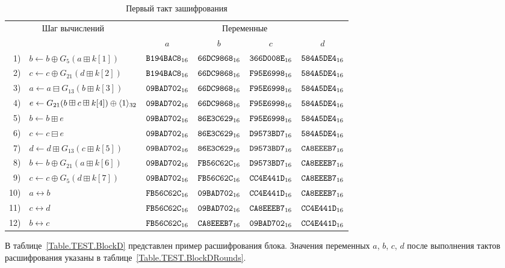 \begin{table}[H]
\caption{Первый такт зашифрования}\label{Table.TEST.BlockEFirstRound}
\begin{tabular}{|rl|c|c|c|c|}
\hline
\multicolumn{2}{|c}{Шаг вычислений}  & \multicolumn{4}{|c|}{Переменные}\\
\cline{3-6}
& & $a$&$b$&$c$&$d$\\
\hline
\hline
1) & $b\leftarrow b\oplus G_5(a\boxplus k[1])$ & 
$\texttt{B194BAC8}_{16}$ &
$\texttt{66DC9868}_{16}$ &
$\texttt{366D008E}_{16}$ &
$\texttt{584A5DE4}_{16}$\\
%
\hline
2) & $c\leftarrow c\oplus G_{21}(d\boxplus k[2])$ & 
$\texttt{B194BAC8}_{16}$ &
$\texttt{66DC9868}_{16}$ &
$\texttt{F95E6998}_{16}$ &
$\texttt{584A5DE4}_{16}$\\
%
\hline
3) & $a\leftarrow a\boxminus G_{13}(b\boxplus k[3])$ & 
$\texttt{09BAD702}_{16}$ &
$\texttt{66DC9868}_{16}$ &
$\texttt{F95E6998}_{16}$ &
$\texttt{584A5DE4}_{16}$\\
%
\hline
4) & $e\leftarrow G_{21}(b\boxplus c\boxplus k[4])\oplus\langle1\rangle_{32}$ & 
$\texttt{09BAD702}_{16}$ &
$\texttt{66DC9868}_{16}$ &
$\texttt{F95E6998}_{16}$ &
$\texttt{584A5DE4}_{16}$\\
%
\hline
5) & $b\leftarrow b\boxplus e$ &
$\texttt{09BAD702}_{16}$ &
$\texttt{86E3C629}_{16}$ &
$\texttt{F95E6998}_{16}$ &
$\texttt{584A5DE4}_{16}$\\
%
\hline
6) & $c\leftarrow c\boxminus e$ &
$\texttt{09BAD702}_{16}$ &
$\texttt{86E3C629}_{16}$ &
$\texttt{D9573BD7}_{16}$ &
$\texttt{584A5DE4}_{16}$\\
%
\hline
7) & $d\leftarrow d\boxplus G_{13}(c\boxplus k[5])$ &
$\texttt{09BAD702}_{16}$ &
$\texttt{86E3C629}_{16}$ &
$\texttt{D9573BD7}_{16}$ &
$\texttt{CA8EEEB7}_{16}$\\
%
\hline
8) & $b\leftarrow b\oplus G_{21}(a\boxplus k[6])$ &
$\texttt{09BAD702}_{16}$ &
$\texttt{FB56C62C}_{16}$ &
$\texttt{D9573BD7}_{16}$ &
$\texttt{CA8EEEB7}_{16}$\\
%
\hline
9) & $c\leftarrow c\oplus G_{5}(d\boxplus k[7])$ &
$\texttt{09BAD702}_{16}$ &
$\texttt{FB56C62C}_{16}$ &
$\texttt{CC4E441D}_{16}$ &
$\texttt{CA8EEEB7}_{16}$\\
%
\hline
10) & $a\leftrightarrow b$ &
$\texttt{FB56C62C}_{16}$ &
$\texttt{09BAD702}_{16}$ &
$\texttt{CC4E441D}_{16}$ &
$\texttt{CA8EEEB7}_{16}$\\
%
\hline
11) & $c\leftrightarrow d$ &
$\texttt{FB56C62C}_{16}$ &
$\texttt{09BAD702}_{16}$ &
$\texttt{CA8EEEB7}_{16}$ &
$\texttt{CC4E441D}_{16}$\\
%
\hline
12) & $b\leftrightarrow c$ &
$\texttt{FB56C62C}_{16}$ &
$\texttt{CA8EEEB7}_{16}$ &
$\texttt{09BAD702}_{16}$ &
$\texttt{CC4E441D}_{16}$\\
\hline
\end{tabular}
\end{table}

В таблице~\ref{Table.TEST.BlockD} представлен пример расшифрования блока.
%
Значения переменных $a$, $b$, $c$, $d$ после выполнения тактов 
расшифрования указаны в таблице~\ref{Table.TEST.BlockDRounds}.

